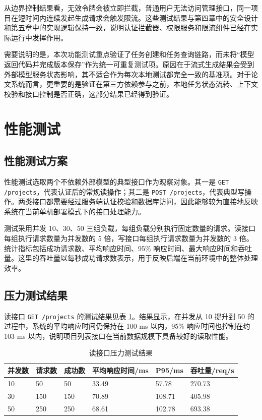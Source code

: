 从边界控制结果看，无效令牌会被立即拦截，普通用户无法访问管理接口，同一项目在短时间内连续发起生成请求会触发限流。这些测试结果与第四章中的安全设计和第五章中的实现逻辑保持一致，说明认证拦截器、权限服务和限流组件已经在实际运行中发挥作用。

需要说明的是，本次功能测试重点验证了任务创建和任务查询链路，而未将“模型返回代码并完成版本保存”作为统一可重复测试项。原因在于流式生成结果会受到外部模型服务状态影响，其不适合作为每次本地测试都完全一致的基准项。对于论文系统而言，更重要的是验证在第三方依赖参与之前，本地任务状态流转、上下文校验和接口控制是否正确，这部分结果已经得到验证。

\section{性能测试}

\subsection{性能测试方案}
性能测试选取两个不依赖外部模型的典型接口作为观察对象。其一是 \texttt{GET /projects}，代表认证后的常规读操作；其二是 \texttt{POST /projects}，代表典型写操作。两类接口都需要经过服务端认证校验和数据库访问，因此能够较为直接地反映系统在当前单机部署模式下的接口处理能力。

测试采用并发 10、30、50 三组负载，每组负载分别执行固定数量的请求。读接口每组执行请求数量为并发数的 5 倍，写接口每组执行请求数量为并发数的 3 倍。统计指标包括成功请求数、平均响应时间、95\% 响应时间、最大响应时间和吞吐量。这里的吞吐量以每秒成功请求数表示，用于反映后端在当前环境中的整体处理效率。

\subsection{压力测试结果}
读接口 \texttt{GET /projects} 的测试结果见表 \ref{tab:chapter6-performance-read}。结果显示，在并发从 10 提升到 50 的过程中，系统的平均响应时间仍保持在 100 ms 以内，95\% 响应时间也控制在约 103 ms 以内，说明项目列表接口在当前数据规模下具备较好的读取性能。

\begin{table}[!htbp]
\centering
\caption{读接口压力测试结果}
\label{tab:chapter6-performance-read}
\small
\begin{tabular}{@{}p{}p{}p{}p{}p{}p{}@{}}
\toprule
并发数 & 请求数 & 成功数 & 平均响应时间/ms & P95/ms & 吞吐量/req/s \\
\midrule
10 & 50 & 50 & 33.49 & 57.78 & 270.73 \\
30 & 150 & 150 & 70.89 & 108.71 & 405.98 \\
50 & 250 & 250 & 68.61 & 102.78 & 693.38 \\
\bottomrule
\end{tabular}
\end{table}

